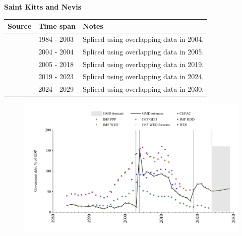 \documentclass[12pt,a4paper,landscape]{article}
\begin{document}
\begin{adjustbox}{max totalsize={\paperwidth}{\paperheight},center}
\begin{minipage}[t][\textheight][t]{\textwidth}
\vspace*{0.5cm}
{}
\begin{center}
{\Large\bfseries Saint Kitts and Nevis}
\end{center}
\vspace{0.5cm}
\begin{table}[H]
\centering
\small
\begin{tabular}{|l|l|l|}
\hline
\textbf{Source} & \textbf{Time span} & \textbf{Notes} \\
\hline
\rowcolor{white}\cite{IMF_GDD}& 1984 - 2003 &Spliced using overlapping data in 2004.\\
\rowcolor{lightgray}\cite{IMF_FPP}& 2004 - 2004 &Spliced using overlapping data in 2005.\\
\rowcolor{white}\cite{IMF_GDD}& 2005 - 2018 &Spliced using overlapping data in 2019.\\
\rowcolor{lightgray}\cite{IMF_FPP}& 2019 - 2023 &Spliced using overlapping data in 2024.\\
\rowcolor{white}\cite{IMF_WEO_forecast}& 2024 - 2029 &Spliced using overlapping data in 2030.\\
\hline
\end{tabular}
\end{table}
\begin{figure}[H]
\centering
\includegraphics[width=\textwidth,height=0.6\textheight,keepaspectratio]{graphs/KNA_govdebt_GDP.pdf}
\end{figure}
\end{minipage}
\end{adjustbox}
\end{document}
